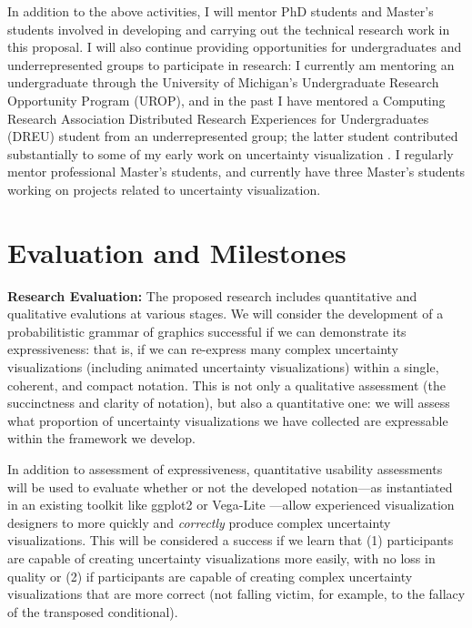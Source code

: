 \documentclass[11pt]{article}
\begin{document}
In addition to the above activities, I will mentor PhD students and Master's students involved in developing and carrying out the technical research work in this proposal. I will also continue providing opportunities for undergraduates and underrepresented groups to participate in research: I currently am mentoring an undergraduate through the University of Michigan's Undergraduate Research Opportunity Program (UROP), and in the past I have
mentored a Computing Research Association Distributed Research Experiences for Undergraduates (DREU) student from an underrepresented group; the latter student contributed substantially to some of my early work on uncertainty visualization \cite{kay2016bus}. I regularly mentor professional Master's students, and currently have three Master's students working on projects related to uncertainty visualization.


\section{Evaluation and Milestones}

\noindent\textbf{Research Evaluation:}
The proposed research includes quantitative and qualitative evalutions at various stages. We will consider the development of a probabilitistic grammar of graphics successful if we can demonstrate its expressiveness: that is, if we can re-express many complex uncertainty visualizations (including animated uncertainty visualizations) within a single, coherent, and compact notation. This is not only a qualitative assessment (the succinctness and clarity of notation), but also a quantitative one: we will assess what proportion of uncertainty visualizations we have collected are expressable within the framework we develop.

In addition to assessment of expressiveness, quantitative usability assessments will be used to evaluate whether or not the developed notation---as instantiated in an existing toolkit like ggplot2 \cite{wickham2016ggplot2} or Vega-Lite \cite{Satyanarayan2017vegalite}---allow experienced visualization designers to more quickly and \emph{correctly} produce complex uncertainty visualizations. This will be considered a success if we learn that (1) participants are capable of creating uncertainty visualizations more easily, with no loss in quality or (2) if participants are capable of creating complex uncertainty visualizations that are more correct (not falling victim, for example, to the fallacy of the transposed conditional).
\end{document}
